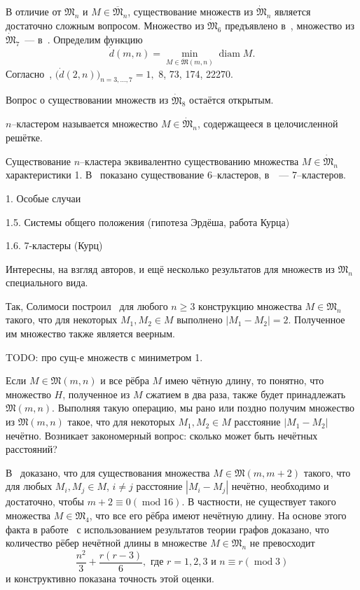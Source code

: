 В отличие от $\mathfrak{M}_n$ и $M\in\overline{\mathfrak{M}}_n$,
существование множеств из $\dot{\mathfrak{M}}_n$ является достаточно сложным вопросом.
Множество из $\dot{\mathfrak{M}}_6$ предъявлено в~\cite{noll1989nclusters},
множество из $\dot{\mathfrak{M}}_7$~--- в~\cite{kurz2008minimum}.
Определим функцию~\cite{kurz2008minimum}
\begin{equation*}
	\dot{d}(m,n) = \min_{M\in\dot{\mathfrak{M}}(m,n)} \operatorname{diam} M
	.
\end{equation*}
Согласно~\cite{kurz2008minimum},
$\bigl(\dot{d}(2,n)\bigr)_{n=3,...,7}
= 1,$ 8, 73, 174, 22270.

Вопрос о существовании множеств из $\dot{\mathfrak{M}}_8$
остаётся открытым.

\begin{definition}
	\cite{noll1989nclusters,kurz2013constructing}
	$n$--кластером называется множество $M\in\dot{\mathfrak{M}}_n$,
	содержащееся в целочисленной решётке.
\end{definition}
Существование $n$--кластера эквивалентно существованию множества $M\in\dot{\mathfrak{M}}_n$
характеристики 1.
В~\cite{noll1989nclusters} показано существование 6--кластеров,
в~\cite{kurz2013constructing}~--- 7--кластеров.

1. Особые случаи

1.5. Системы общего положения (гипотеза Эрдёша, работа Курца)
\cite{kreisel2008heptagon}

1.6. 7-кластеры (Курц)


Интересны, на взгляд авторов, и ещё несколько результатов для множеств из $\mathfrak{M}_n$ специального вида.

Так, Солимоси построил~\cite{solymosi2003note} для любого $n\geq 3$ конструкцию множества $M\in\mathfrak{M}_n$
такого, что для некоторых $M_1, M_2 \in M$ выполнено $|M_1 - M_2| = 2$.
Полученное им множество также является веерным.


TODO: про сущ-е множеств с миниметром 1.

Если $M\in\mathfrak{M}(m,n)$ и все рёбра $M$ имею чётную длину,
то понятно, что множество $H$, полученное из $M$ сжатием в два раза,
также будет принадлежать $\mathfrak{M}(m,n)$.
Выполняя такую операцию, мы рано или поздно получим множество из $\mathfrak{M}(m,n)$ такое,
что для некоторых $M_1,M_2\in M$ расстояние $|M_1 - M_2|$ нечётно.
Возникает закономерный вопрос: сколько может быть нечётных расстояний?

В~\cite{graham1974there} доказано, что
для существования множества $M\in\mathfrak{M}(m,m+2)$ такого, что для любых
$M_i,M_j\in M$, $i\neq j$ расстояние $|M_i-M_j|$ нечётно,
необходимо и достаточно, чтобы
$m+2\equiv 0 (\operatorname{mod} 16)$.
В частности, не существует такого множества $M\in\mathfrak{M}_4$,
что все его рёбра имеют нечётную длину.
На основе этого факта в работе~\cite{piepmeyer1996maximum} с использованием результатов теории графов доказано,
что количество рёбер нечётной длины в множестве $M\in\mathfrak{M}_n$ не превосходит
\begin{equation}
	\frac{n^2}{3} + \frac{r(r - 3)}{6}, \mbox{~где~} r = 1, 2, 3 \mbox{~и~} n \equiv r (\operatorname{mod} 3)
\end{equation}
и конструктивно показана точность этой оценки.

